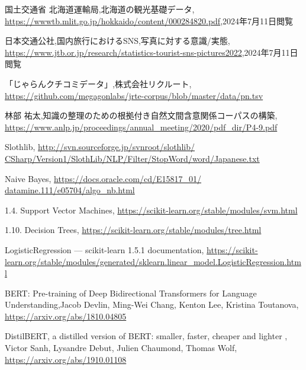 \documentclass[twocolumn,dvipdfmx]{article}
\newcounter{ex}
\begin{document}
 \begin{thebibliography}{99}
  国土交通省 北海道運輸局,北海道の観光基礎データ,
\url{https://wwwtb.mlit.go.jp/hokkaido/content/000284820.pdf},2024年7月11日閲覧

 日本交通公社,国内旅行におけるSNS,写真に対する意識/実態,
\url{https://www.jtb.or.jp/research/statistics-tourist-sns-pictures2022},2024年7月11日閲覧


 「じゃらんクチコミデータ」,株式会社リクルート,
\url{https://github.com/megagonlabs/jrte-corpus/blob/master/data/pn.tsv}

林部 祐太,知識の整理のための根拠付き自然文間含意関係コーパスの構築,
\url{https://www.anlp.jp/proceedings/annual_meeting/2020/pdf_dir/P4-9.pdf}

Slothlib,
\url{http://svn.sourceforge.jp/svnroot/slothlib/
CSharp/Version1/SlothLib/NLP/Filter/StopWord/word/Japanese.txt}

Naive Bayes,
\url{https://docs.oracle.com/cd/E15817_01/
datamine.111/e05704/algo_nb.html}

1.4. Support Vector Machines,
\url{https://scikit-learn.org/stable/modules/svm.html}


1.10. Decision Trees,
\url{https://scikit-learn.org/stable/modules/tree.html}


LogisticRegression — scikit-learn 1.5.1 documentation, 
\url{https://scikit-learn.org/stable/modules/generated/sklearn.linear_model.LogisticRegression.html}

BERT: Pre-training of Deep Bidirectional Transformers for Language Understanding,Jacob Devlin, Ming-Wei Chang, Kenton Lee, Kristina Toutanova,
\url{https://arxiv.org/abs/1810.04805}

DistilBERT, a distilled version of BERT: smaller, faster, cheaper and lighter ,
Victor Sanh, Lysandre Debut, Julien Chaumond, Thomas Wolf,
\url{https://arxiv.org/abs/1910.01108}

\end{thebibliography}
\end{document}

